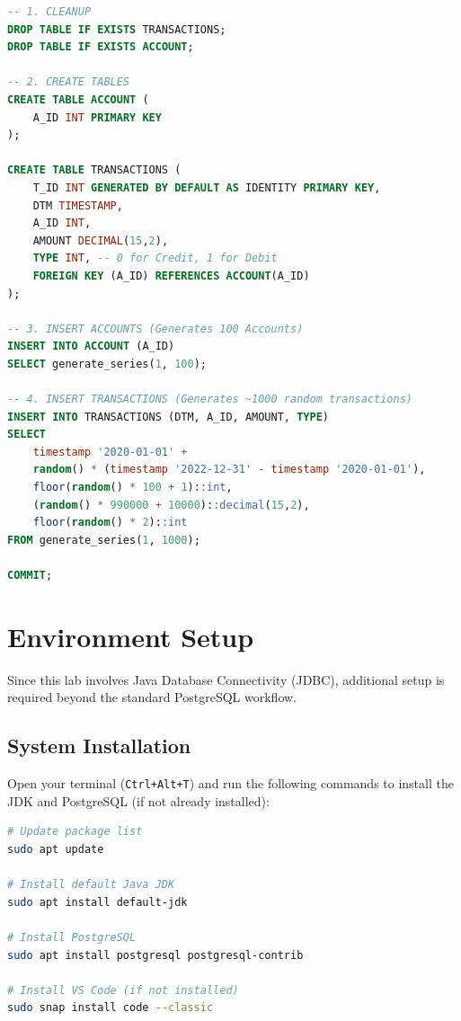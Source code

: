 \documentclass[12pt,a4paper]{article}
\begin{document}
\begin{lstlisting}[language=SQL, caption={lab\_09\_setup.sql}]
-- 1. CLEANUP
DROP TABLE IF EXISTS TRANSACTIONS;
DROP TABLE IF EXISTS ACCOUNT;

-- 2. CREATE TABLES
CREATE TABLE ACCOUNT (
    A_ID INT PRIMARY KEY
);

CREATE TABLE TRANSACTIONS (
    T_ID INT GENERATED BY DEFAULT AS IDENTITY PRIMARY KEY,
    DTM TIMESTAMP,
    A_ID INT,
    AMOUNT DECIMAL(15,2),
    TYPE INT, -- 0 for Credit, 1 for Debit
    FOREIGN KEY (A_ID) REFERENCES ACCOUNT(A_ID)
);

-- 3. INSERT ACCOUNTS (Generates 100 Accounts)
INSERT INTO ACCOUNT (A_ID)
SELECT generate_series(1, 100);

-- 4. INSERT TRANSACTIONS (Generates ~1000 random transactions)
INSERT INTO TRANSACTIONS (DTM, A_ID, AMOUNT, TYPE)
SELECT
    timestamp '2020-01-01' + 
    random() * (timestamp '2022-12-31' - timestamp '2020-01-01'),
    floor(random() * 100 + 1)::int,
    (random() * 990000 + 10000)::decimal(15,2),
    floor(random() * 2)::int
FROM generate_series(1, 1000); 

COMMIT;
\end{lstlisting}

\newpage
\section{Environment Setup}

Since this lab involves Java Database Connectivity (JDBC), additional setup is required beyond the standard PostgreSQL workflow.

\subsection{System Installation}
Open your terminal (\texttt{Ctrl+Alt+T}) and run the following commands to install the JDK and PostgreSQL (if not already installed):

\begin{lstlisting}[language=bash]
# Update package list
sudo apt update

# Install default Java JDK
sudo apt install default-jdk

# Install PostgreSQL
sudo apt install postgresql postgresql-contrib

# Install VS Code (if not installed)
sudo snap install code --classic
\end{lstlisting}
\end{document}
